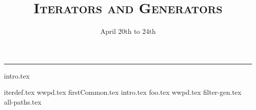\documentclass{exam}
\title{\textsc{Iterators and Generators}}
\date{April 20th to 24th}
\begin{document}
\maketitle
\rule{\textwidth}{0.15em}
\fontsize{12}{15}\selectfont

{intro.tex}
\begin{questions}
\newpage
{iterdef.tex}
{wwpd.tex}
\newpage
{firstCommon.tex}
\newpage
{intro.tex}
\newpage
{foo.tex}
\newpage
{wwpd.tex}
{filter-gen.tex}
\newpage
{all-paths.tex}

\newpage
\end{questions}
\end{document}
